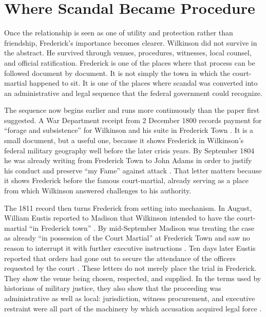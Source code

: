 \section{Where Scandal Became Procedure}

Once the relationship is seen as one of utility and protection rather than friendship, Frederick's importance becomes clearer. Wilkinson did not survive in the abstract. He survived through venues, procedures, witnesses, local counsel, and official ratification. Frederick is one of the places where that process can be followed document by document. It is not simply the town in which the court-martial happened to sit. It is one of the places where scandal was converted into an administrative and legal sequence that the federal government could recognize.

The sequence now begins earlier and runs more continuously than the paper first suggested. A War Department receipt from 2 December 1800 records payment for ``forage and subsistence'' for Wilkinson and his suite in Frederick Town \citep{wardepartment1800receipt}. It is a small document, but a useful one, because it shows Frederick in Wilkinson's federal military geography well before the later crisis years. By September 1804 he was already writing from Frederick Town to John Adams in order to justify his conduct and preserve ``my Fame'' against attack \citep{wilkinson1804adams}. That letter matters because it shows Frederick before the famous court-martial, already serving as a place from which Wilkinson answered challenges to his authority.

The 1811 record then turns Frederick from setting into mechanism. In August, William Eustis reported to Madison that Wilkinson intended to have the court-martial ``in Frederick town'' \citep{eustis1811a}. By mid-September Madison was treating the case as already ``in possession of the Court Martial'' at Frederick Town and saw no reason to interrupt it with further executive instructions \citep{madison1811eustis}. Ten days later Eustis reported that orders had gone out to secure the attendance of the officers requested by the court \citep{eustis1811b}. These letters do not merely place the trial in Frederick. They show the venue being chosen, respected, and supplied. In the terms used by historians of military justice, they also show that the proceeding was administrative as well as local: jurisdiction, witness procurement, and executive restraint were all part of the machinery by which accusation acquired legal force \citep{lurie2001,kohn1975,stagg1983}.

